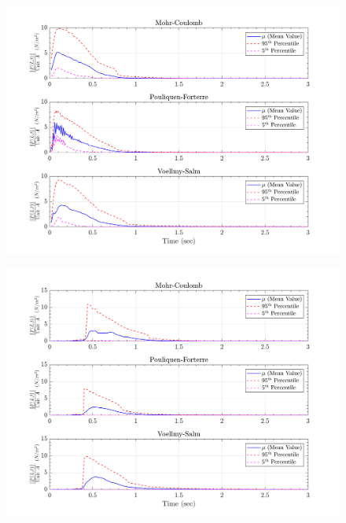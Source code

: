 \documentclass{article}
\begin{document}
\begin{figure}[H]
	\begin{minipage}[b]{0.5\linewidth}
    	\centering
    	\includegraphics[width=1\textwidth]{InclinedPlane/LocalRecords/Records/Fbc_L1.png}
    	\label{fig:Ramp-L1-Fbc}
	\end{minipage}
	\begin{minipage}[b]{0.5\linewidth}
		\centering
		\includegraphics[width=1\textwidth]{InclinedPlane/LocalRecords/Records/Fbc_L8.png}
    	\label{fig:Ramp-L2-Fbc}
    \end{minipage}
    

\end{figure}
\end{document}
